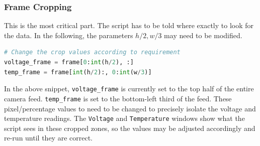 \subsubsection{Frame Cropping}\label{frame-cropping}
This is the most critical part. The script has to be told where exactly to look for the data.  In the following, the parameters 
$h/2, w/3$  
may need to be modified. 
\begin{lstlisting}[language=python]
# Change the crop values according to requirement
voltage_frame = frame[0:int(h/2), :]
temp_frame = frame[int(h/2):, 0:int(w/3)]
\end{lstlisting}
In the above snippet, \texttt{voltage\_frame} is currently set to the top half of the entire camera feed.
\texttt{temp\_frame} is set to the bottom-left third of the feed.
These pixel/percentage values to need to be changed to precisely isolate the voltage and temperature readings. The \texttt{Voltage} and \texttt{Temperature} windows show what the script sees in these cropped zones, so the values may be adjusted accordingly and re-run until they are correct.

